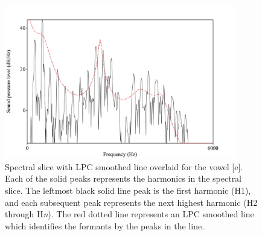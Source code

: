 \documentclass[12pt, letterpaper]{article}
\begin{document}
\begin{figure}[!h]
	\centering
	\includegraphics[width=0.9\textwidth]{Images/Harmonics.png}
	\caption{Spectral slice with LPC smoothed line overlaid for the vowel [e]. Each of the solid peaks represents the harmonics in the spectral slice. The leftmost black solid line peak is the first harmonic (H1), and each subsequent peak represents the next highest harmonic (H2 through H\textit{n}). The red dotted line represents an LPC smoothed line which identifies the formants by the peaks in the line.}
	\label{fig:Harmonics}
\end{figure}
\end{document}

